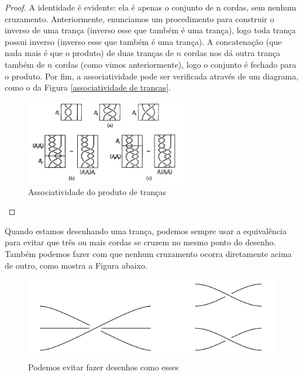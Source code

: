 \documentclass[a4paper,portuguese,11pt,twoside, leqno]{book}
\theoremstyle{definition}
\begin{document}
	\begin{proof}
		A identidade é evidente: ela é apenas o conjunto de n cordas, sem nenhum cruzamento. Anteriormente, enunciamos um procedimento para construir o inverso de uma trança (inverso esse que também é uma trança), logo toda trança possui inverso (inverso esse que também é uma trança). A concatenação (que nada mais é que o produto) de duas tranças de $n$ cordas nos dá outra trança também de $n$ cordas (como vimos anteriormente), logo o conjunto é fechado para o produto. Por fim, a associatividade pode ser verificada através de um diagrama, como o da Figura \eqref{associatividade de trancas}.
		
		\begin{figure}[H]
			\captionsetup{justification=centering}
			\begin{center}
				\includegraphics[width=7.1cm]{Images/associatividade.png}
			\end{center}\caption{Associatividade do produto de tranças}\label{associatividade de trancas}
		\end{figure}
	\end{proof}
	\par\vspace{0.3cm} Quando estamos desenhando uma trança, podemos sempre usar a equivalência para evitar que três ou mais cordas se cruzem no mesmo ponto do desenho. Também podemos fazer com que nenhum cruzamento ocorra diretamente acima de outro, como mostra a Figura abaixo.
	
	\begin{figure}[H]
		\captionsetup{justification=centering}
		\begin{center}
			\includegraphics[width=12cm]{Images/desenhos_evitaveis.png}
		\end{center}\caption{Podemos evitar fazer desenhos como esses}\label{diagramas indesejaveis}
	\end{figure}
	
\end{document}
